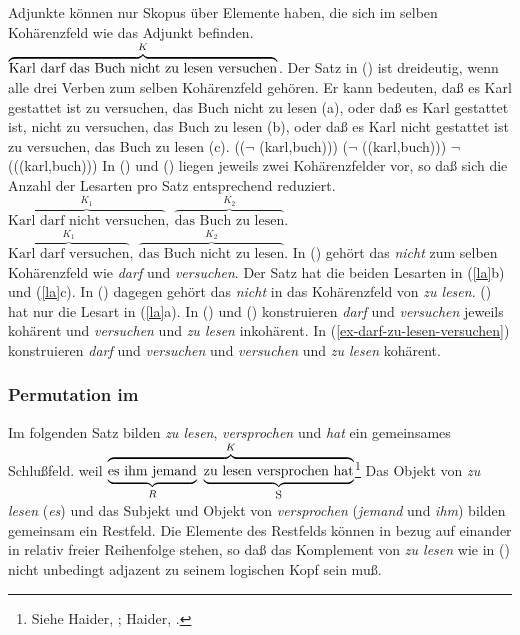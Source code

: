 Adjunkte können nur Skopus über Elemente haben, die sich im selben Kohärenzfeld
wie das Adjunkt befinden.
\ea
\label{ex-darf-zu-lesen-versuchen}
$\overbrace{ \mbox{Karl darf\iw{dürfen} das Buch nicht zu lesen versuchen} }^{K}$.
\z
Der Satz in () ist dreideutig, wenn alle drei Verben zum selben Kohärenzfeld
gehören. Er kann bedeuten, daß es Karl gestattet ist zu versuchen,
das Buch nicht zu lesen (a), oder daß es Karl gestattet ist, nicht zu versuchen, das Buch zu lesen (b),
oder daß es Karl nicht gestattet ist zu versuchen, das Buch zu lesen (c).
\eal
\label{la}
\ex {}(($\neg$ (karl,buch)))
\ex {}($\neg$ ((karl,buch)))
\ex $\neg$ (((karl,buch)))
\zl
In () und () liegen jeweils zwei Kohärenzfelder vor, so daß
sich die Anzahl der Lesarten pro Satz entsprechend reduziert.
\ea
$\overbrace{ \mbox{Karl darf nicht versuchen}}^{K_1},~\overbrace{\mbox{das Buch zu lesen}}^{K_2}$.
\z
\ea
$\overbrace{ \mbox{Karl darf versuchen}}^{K_1},~\overbrace{\mbox{das Buch nicht zu lesen}}^{K_2}$.
\z
In () gehört das \emph{nicht} zum selben Kohärenzfeld wie \emph{darf}
und \emph{versuchen}. Der Satz hat die beiden Lesarten in (\ref{la}b) und (\ref{la}c).
In () dagegen gehört das \emph{nicht} in das Kohärenzfeld
von \emph{zu lesen}. () hat nur die Lesart in (\ref{la}a). In () und ()
konstruieren \emph{darf} und \emph{versuchen} jeweils kohärent und \emph{versuchen} und \emph{zu
lesen} inkohärent. In (\ref{ex-darf-zu-lesen-versuchen}) konstruieren \emph{darf} und
\emph{versuchen} und \emph{versuchen} und \emph{zu lesen} kohärent.

\subsubsection{Permutation im \mf}

Im folgenden Satz bilden \emph{zu lesen}, \emph{versprochen} und \emph{hat}
ein gemeinsames Schlußfeld.
\ea
\label{zu-lesen-versp}
weil $\overbrace{ \underbrace{\rule[-0.5ex]{0cm}{2.5ex}\mbox{es ihm jemand} }_{R}~
                    \underbrace{\rule[-0.5ex]{0cm}{2.5ex}\mbox{zu lesen versprochen\iw{versprechen} hat}}_{\mbox{\footnotesize S}}
                  }^{K}$\footnote{
        Siehe Haider, \citeyear[]{Haider86c}; Haider, \citeyear[]{Haider90b}.
}
\z
Das Objekt von \emph{zu lesen} (\emph{es})
und das Subjekt und Objekt von \emph{versprochen} (\emph{jemand} und \emph{ihm})
bilden gemeinsam ein Restfeld. Die Elemente des Restfelds können in bezug
auf einander in relativ freier Reihenfolge stehen, so daß das Komplement von \emph{zu lesen}
wie in () nicht unbedingt adjazent zu seinem logischen Kopf sein muß.

